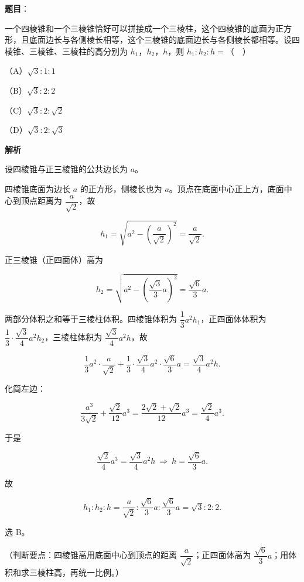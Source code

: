 \begin{answer}

\textbf{题目}：

一个四棱锥和一个三棱锥恰好可以拼接成一个三棱柱，这个四棱锥的底面为正方形，且底面边长与各侧棱长相等，这个三棱锥的底面边长与各侧棱长都相等。设四棱锥、三棱锥、三棱柱的高分别为 $h_1$，$h_2$，$h$，则 $h_1:h_2:h=$（　）

（A）$\sqrt3:1:1$

（B）$\sqrt3:2:2$

（C）$\sqrt3:2:\sqrt2$

（D）$\sqrt3:2:\sqrt3$

\textbf{解析}

设四棱锥与正三棱锥的公共边长为 $a$。

四棱锥底面为边长 $a$ 的正方形，侧棱长也为 $a$。顶点在底面中心正上方，底面中心到顶点距离为 $\dfrac{a}{\sqrt2}$，故

\nopagebreak[4]
\[h_1=\sqrt{a^2-\left(\frac{a}{\sqrt2}\right)^2}=\frac{a}{\sqrt2}.\]

正三棱锥（正四面体）高为

\nopagebreak[4]
\[h_2=\sqrt{a^2-\left(\frac{\sqrt3}{3}a\right)^2}=\frac{\sqrt6}{3}a.\]

两部分体积之和等于三棱柱体积。四棱锥体积为 $\dfrac13a^2h_1$，正四面体体积为 $\dfrac13\cdot\dfrac{\sqrt3}{4}a^2h_2$，三棱柱体积为 $\dfrac{\sqrt3}{4}a^2h$，故

\nopagebreak[4]
\[\frac13a^2\cdot\frac{a}{\sqrt2}+\frac13\cdot\frac{\sqrt3}{4}a^2\cdot\frac{\sqrt6}{3}a=\frac{\sqrt3}{4}a^2h.\]

化简左边：

\nopagebreak[4]
\[\frac{a^3}{3\sqrt2}+\frac{\sqrt2}{12}a^3=\frac{2\sqrt2+\sqrt2}{12}a^3=\frac{\sqrt2}{4}a^3.\]

于是

\nopagebreak[4]
\[\frac{\sqrt2}{4}a^3=\frac{\sqrt3}{4}a^2h\ \Rightarrow\ h=\frac{\sqrt6}{3}a.\]

故

\nopagebreak[4]
\[h_1:h_2:h=\frac{a}{\sqrt2}:\frac{\sqrt6}{3}a:\frac{\sqrt6}{3}a=\sqrt3:2:2.\]

选 B。

（判断要点：四棱锥高用底面中心到顶点的距离 $\dfrac{a}{\sqrt2}$；正四面体高为 $\dfrac{\sqrt6}{3}a$；用体积和求三棱柱高，再统一比例。）


\end{answer}
